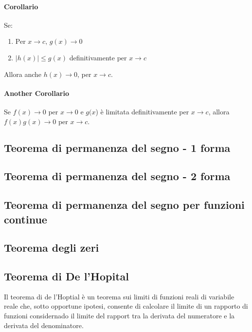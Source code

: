 \paragraph*{Corollario} Se:
\begin{enumerate}
	\item Per $x \rightarrow c, \, g(x) \rightarrow 0$
	\item $|h(x)|\leq g(x)$ definitivamente per $x \rightarrow c$
\end{enumerate}
Allora anche $h(x) \rightarrow 0$, per $x\rightarrow c$.
\paragraph*{Another Corollario}Se $f(x) \rightarrow 0$ per $x \rightarrow 0$ e $g(x$)
è limitata definitivamente per $x \rightarrow c$, allora $f(x)g(x) \rightarrow 0$
per $x \rightarrow c$.
\subsection*{Teorema di permanenza del segno - 1 forma}
\subsection*{Teorema di permanenza del segno - 2 forma}
\subsection*{Teorema di permanenza del segno per funzioni continue}
\subsection*{Teorema degli zeri}

\subsection{Teorema di De l'Hopital}
Il teorema di de l'Hoptial è un teorema sui limiti di funzioni reali di variabile reale che,
sotto opportune ipotesi, consente di calcolare il limite di un rapporto di funzioni considernado il limite del rapport tra la derivata del numeratore e la derivata del denominatore.

